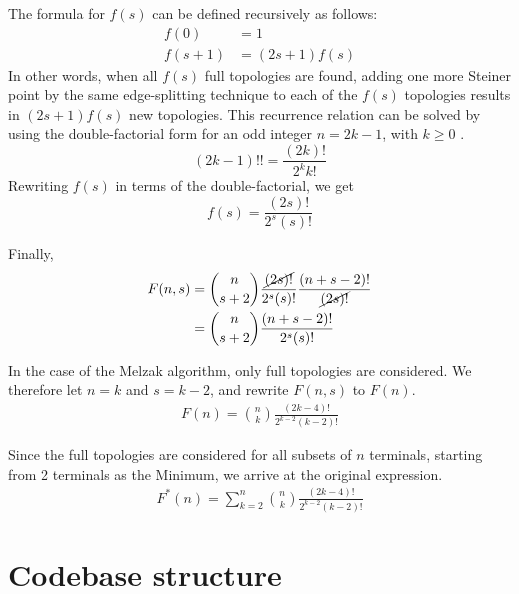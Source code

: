 \documentclass{l4proj}
\begin{document}
\begin{appendices}
    The formula for $f(s)$ can be defined recursively as follows:
    \begin{equation*}
        \begin{aligned}
            f(0)   & = 1            \\
            f(s+1) & = (2s + 1)f(s)
        \end{aligned}
    \end{equation*}
    In other words, when all $f(s)$ full topologies are found, adding one more Steiner point by the same edge-splitting technique to each of the $f(s)$ topologies results in $(2s + 1)f(s)$ new topologies.
    This recurrence relation can be solved by using the double-factorial form for an odd integer $n = 2k - 1$, with $k \ge 0$ \citep{Double_factorial}.
    $$
        (2k - 1)!! = \frac{(2k)!}{2^k k!}
    $$
    Rewriting $f(s)$ in terms of the double-factorial, we get
    $$
        f(s) = \frac{(2s)!}{2^{s}(s)!}
    $$

    Finally,
    \begin{equation*}
        \begin{aligned}
            F(n, s) & = \binom{n}{s+2}\frac{\cancel{(2s)!}}{2^s(s)!}\frac{(n + s - 2)!}{\cancel{(2s)!}} \\
                    & = \binom{n}{s+2}\frac{(n + s - 2)!}{2^s(s)!}
        \end{aligned}
    \end{equation*}

    In the case of the Melzak algorithm, only full topologies are considered. We therefore let $n = k$ and $s = k - 2$, and rewrite $F(n, s)$ to $F(n)$.
    \begin{equation*}
        \begin{aligned}
            F(n) = \binom{n}{k}\frac{(2k - 4)!}{2^{k-2}(k-2)!}
        \end{aligned}
    \end{equation*}

    Since the full topologies are considered for all subsets of $n$ terminals, starting from 2 terminals as the Minimum, we arrive at the original expression.
    \begin{equation*}
        \begin{aligned}
            F^*(n) = \sum_{k=2}^{n} \binom{n}{k}\frac{(2k - 4)!}{2^{k-2}(k-2)!}
        \end{aligned}
    \end{equation*}

    \chapter{Codebase structure}
    \label{app:repository_structure}
    



\end{appendices}




\renewcommand{\thechapter}{0}

\end{document}
